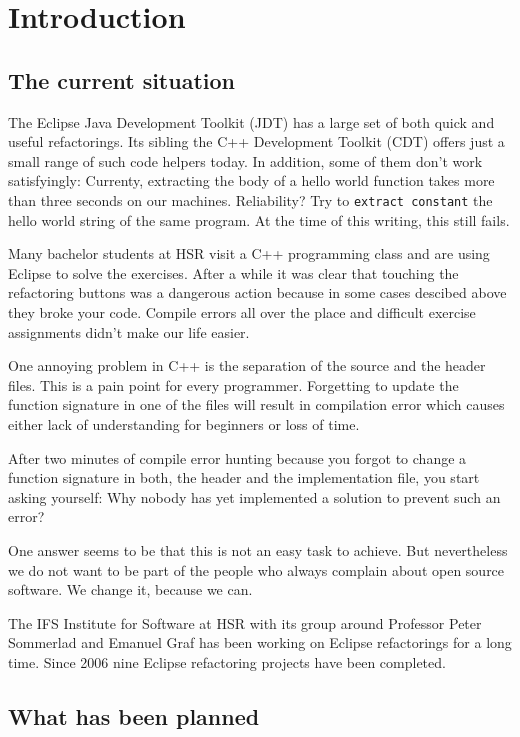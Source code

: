 \chapter{Introduction}
\thispagestyle{fancy}

\section{The current situation}

The Eclipse Java Development Toolkit (JDT) has a large set of both quick and
useful refactorings. Its sibling the C++ Development Toolkit (CDT) offers just a
small range of such code helpers today. In addition, some of them don't work
satisfyingly: Currenty, extracting the body of a hello world function takes more
than three seconds on our machines. Reliability? Try to \texttt{extract
constant} the hello world string of the same program. At the time of this 
writing, this still fails.

Many bachelor students at HSR visit a C++ programming class and are using 
Eclipse to solve the exercises. After a while it was clear that
touching the refactoring buttons was a dangerous action because in some cases
descibed above they broke your code. Compile errors all over the place and
difficult exercise assignments didn't make our life easier.

One annoying problem in C++ is the separation of the source and the header
files. This is a pain point for every programmer. Forgetting to update the
function signature in one of the files will result in compilation error which
causes either lack of understanding for beginners or loss of time.

After two minutes of compile error hunting because you forgot to change a
function signature in both, the header and the implementation file, you start
asking yourself: Why nobody has yet implemented a solution to prevent such an
error?

One answer seems to be that this is not an easy task to achieve. But
nevertheless we do not want to be part of the people who always complain about
open source software. We change it, because we can.
 
The IFS Institute for Software at HSR with its group around Professor Peter
Sommerlad and
Emanuel Graf has been working on Eclipse refactorings for a long time. Since
2006 nine Eclipse refactoring projects have been completed.

\section{What has been planned}

